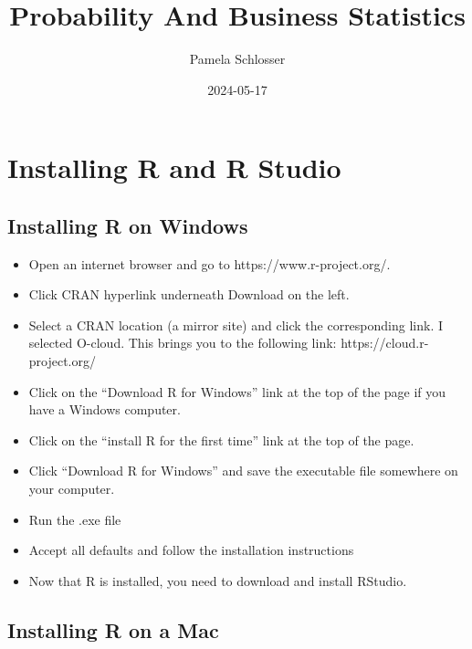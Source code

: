 \documentclass[
  letterpaper,
  DIV=11,
  numbers=noendperiod]{scrreprt}
\title{Probability And Business Statistics}
\author{Pamela Schlosser}
\date{2024-05-17}
\providecommand{\tightlist}{%
  \setlength{\itemsep}{0pt}\setlength{\parskip}{0pt}}\usepackage{longtable,booktabs,array}
\renewcommand*\contentsname{Table of contents}
\newcommand\contentsname{Table of contents}
\begin{document}
\maketitle

\renewcommand*\contentsname{Table of contents}
{
\hypersetup{linkcolor=}
\setcounter{tocdepth}{2}
\tableofcontents
}

\chapter{Installing R and R Studio}\label{installing-r-and-r-studio}

\section{Installing R on Windows}\label{installing-r-on-windows}

\begin{itemize}
\tightlist
\item
  Open an internet browser and go to https://www.r-project.org/.
\item
  Click CRAN hyperlink underneath Download on the left.
\item
  Select a CRAN location (a mirror site) and click the corresponding
  link. I selected O-cloud. This brings you to the following link:
  https://cloud.r-project.org/
\item
  Click on the ``Download R for Windows'' link at the top of the page if
  you have a Windows computer.\\
\item
  Click on the ``install R for the first time'' link at the top of the
  page.
\item
  Click ``Download R for Windows'' and save the executable file
  somewhere on your computer.
\item
  Run the .exe file
\item
  Accept all defaults and follow the installation instructions
\item
  Now that R is installed, you need to download and install RStudio.
\end{itemize}

\section{Installing R on a Mac}\label{installing-r-on-a-mac}
\end{document}

